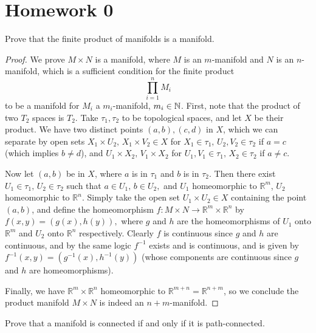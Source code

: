 \section*{Homework 0}
\begin{problem}
    Prove that the finite product of manifolds is a manifold.
\end{problem}
\begin{proof}
    We prove $M \times N$ is a manifold, where $M$ is an $m$-manifold and $N$ is an $n$-manifold, which is a sufficient condition for the finite product 
\[
    \prod_{i=1}^n M_{i}
\]
to be a manifold for $M_i$ a $m_i$-manifold, $m_i \in \mathbb{N}$. First, note that the product of two $T_2$ spaces is $T_2$. Take $\tau_1, \tau_2$ to be topological spaces, and let $X$ be their product. We have two distinct points $(a,b), (c,d)$ in $X$, which we can separate by open sets $X_1 \times U_2, \, X_1 \times V_2 \in X$ for $X_1 \in \tau_1, \, U_2, V_2 \in \tau_2$ if $a = c$ (which implies $b \neq d$), and  $U_1 \times X_2, \, V_1 \times X_2$ for $U_1, V_1 \in \tau_1, \, X_2 \in \tau_2$ if $a \neq c.$ 

Now let $(a,b)$ be in $X$, where $a$ is in $\tau_1$ and $b$ is in $\tau_2.$ Then there exist $U_1 \in \tau_1, \, U_2 \in \tau_2$ such that $a \in U_1, \, b\in U_2,$ and $U_1$ homeomorphic to $\mathbb{R}^m$, $U_2$ homeomorphic to $\mathbb{R}^n.$ Simply take the open set $U_1 \times U_2 \in X$ containing the point $(a,b)$, and define the homeomorphism $f: M \times N \to \mathbb{R}^m \times \mathbb{R}^n$ by  $f(x,y)=(g(x),h(y)),$ where $g$ and $h$ are the homeomorphisms of $U_1$ onto $\mathbb{R}^m$ and $U_2$ onto $\mathbb{R}^n$ respectively. Clearly $f$ is continuous since $g$ and $h$ are continuous, and by the same logic $f^{-1}$ exists and is continuous, and is given by $f^{-1}(x,y) = (g^{-1}(x),h^{-1}(y))$ (whose components are continuous since $g$ and $h$ are homeomorphisms).

Finally, we have $\mathbb{R}^m \times \mathbb{R}^n$ homeomorphic to $\mathbb{R}^{m+n}=\mathbb{R}^{n+m}$, so we conclude the product manifold $M \times N$ is indeed an $n+m$-manifold.
\end{proof}
\vspace{10mm}

\begin{problem}
    Prove that a manifold is connected if and only if it is path-connected.
\end{problem}


